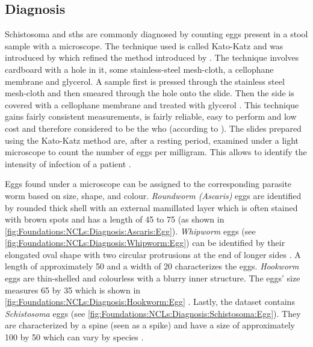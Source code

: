 \subsection{Diagnosis}
\label{sec:Foundations:NTDs:Diagnosis}

Schistosoma and \acp{sth} are commonly diagnosed by counting eggs present in a stool sample with a microscope. The technique used is called Kato-Katz \cite{nelwan2019schistosomiasis} and was introduced by \textcite{katz1972simple} which refined the method introduced by \citeauthor{kato1954comparative} \cite{kato1954comparative,kato1960correct}. The technique involves cardboard with a hole in it, some stainless-steel mesh-cloth, a cellophane membrane and glycerol. A sample first is pressed through the stainless steel mesh-cloth and then smeared through the hole onto the slide. Then the side is covered with a cellophane membrane and treated with glycerol \cite{mbongngwese2020diagnostic}. This technique gains fairly consistent measurements, is fairly reliable, easy to perform and low cost \cite{katz1972simple} and therefore considered to be the \ac{who}  (according to \textcite{mbongngwese2020diagnostic}).
The slides prepared using the Kato-Katz method are, after a resting period, examined under a light microscope to count the number of eggs per milligram. This allows to identify the intensity of infection of a patient \cite{feasey2010neglected}. 

Eggs found under a microscope can be assigned to the corresponding parasite worm based on size, shape, and colour. \emph{Roundworm (Ascaris)} eggs are identified by rounded thick shell with an external mamillated layer which is often stained with brown spots and has a length of \unit{45}{\micro\meter} to \unit{75}{\micro\meter} \cite{dpdx2019ascariasis} (as shown in \autoref{fig:Foundations:NCLs:Diagnosis:Ascaris:Egg}).
\emph{Whipworm} eggs (see \autoref{fig:Foundations:NCLs:Diagnosis:Whipworm:Egg}) can be identified by their elongated oval shape with two circular protrusions at the end of longer sides \cite{dpdx2017trichuriasis,larsson2020development}. A length of approximately \unit{50}{\micro\meter} and a width of \unit{20}{\micro\meter} characterizes the eggs.
\emph{Hookworm} eggs are thin-shelled and colourless with a blurry inner structure. The eggs' size measures \unit{65}{\micro\meter} by \unit{35}{\micro\meter} which is shown in \autoref{fig:Foundations:NCLs:Diagnosis:Hookworm:Egg} \cite{dpdx2019hookworm, larsson2020development}.
Lastly, the dataset contains \emph{Schistosoma} eggs (see \autoref{fig:Foundations:NCLs:Diagnosis:Schistosoma:Egg}). They are characterized by a spine (seen as a spike) 
and have a size of approximately \unit{100}{\micro\meter} by \unit{50}{\micro\meter} which can vary by species \cite{dpdx2019schistosomiasis, larsson2020development}.

